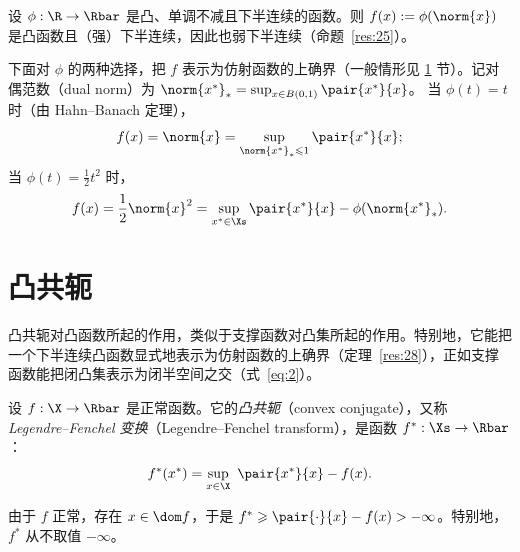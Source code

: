 \begin{example}[范数的函数]
\label{exa:8}
设 $\phi:\R\to\Rbar$ 是凸、单调不减且下半连续的函数。则 $f(x):=\phi(\norm{x})$ 是凸函数且（强）下半连续，因此也弱下半连续（命题~\ref{res:25}）。

下面对 $\phi$ 的两种选择，把 $f$ 表示为仿射函数的上确界（一般情形见 \ref{sec:ch02-conjugate} 节）。记对偶范数（dual norm）为 $\norm{x^*}_*=\sup_{x\in B(0,1)}\pair{x^*}{x}$。
当 $\phi(t)=t$ 时（由 Hahn--Banach 定理），
\[
  f(x)=\norm{x}=\sup_{\norm{x^*}_*\leqslant1}\pair{x^*}{x};
\]
当 $\phi(t)=\frac12t^2$ 时，
\[
  f(x)=\frac12\norm{x}^2=\sup_{x^*\in\Xs}\pair{x^*}{x}-\phi(\norm{x^*}_*).
\]
\end{example}

\section{凸共轭}
\label{sec:ch02-conjugate}

凸共轭对凸函数所起的作用，类似于支撑函数对凸集所起的作用。特别地，它能把一个下半连续凸函数显式地表示为仿射函数的上确界（定理~\ref{res:28}），正如支撑函数能把闭凸集表示为闭半空间之交（式~\eqref{eq:2}）。

\begin{definition}[凸共轭]
\label{def:18}
设 $f:\X\to\Rbar$ 是正常函数。它的\emph{凸共轭}（convex conjugate），又称 \emph{Legendre--Fenchel 变换}（Legendre--Fenchel transform），是函数 $f^*:\Xs\to\Rbar$：
\[
  f^*(x^*)=\sup_{x\in\X}\ \pair{x^*}{x}-f(x).
\]
\end{definition}

由于 $f$ 正常，存在 $x\in\dom f$，于是 $f^*\geqslant\pair{\cdot}{x}-f(x)>-\infty$。特别地，$f^*$ 从不取值 $-\infty$。

